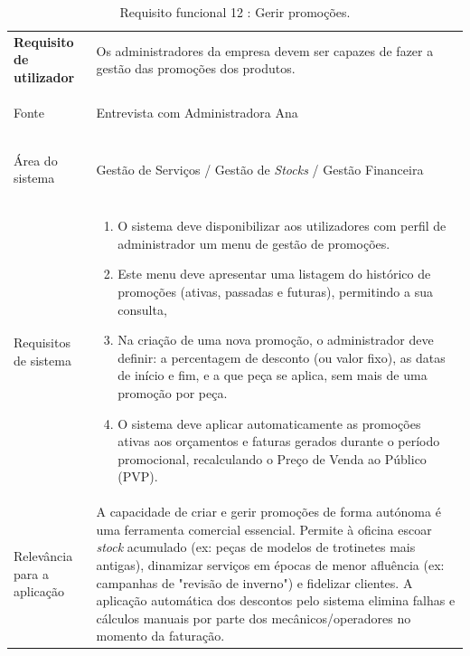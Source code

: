 \documentclass[a4paper,12pt]{scrreprt}
\begin{document}
\begin{table}[H]
    \centering
    \renewcommand{\arraystretch}{1.5} 
    
    \begin{tabular}{|>{\columncolor{gray!15}\bfseries}p{4cm}|p{10.5cm}|}
        \hline
        Requisito de utilizador & Os administradores da empresa devem ser capazes de fazer a gestão das promoções dos produtos.\\ \hdashline
      
        Fonte & Entrevista com Administradora Ana \\ \hdashline
        
        Área do sistema & Gestão de Serviços / Gestão de \textit{Stocks} / Gestão Financeira \\ \hdashline
        
        Requisitos de sistema & 
        \begin{enumerate}[leftmargin=*, nosep, topsep=2pt, partopsep=0pt]
            \item O sistema deve disponibilizar aos utilizadores com perfil de administrador um menu de gestão de promoções.
            \item Este menu deve apresentar uma listagem do histórico de promoções (ativas, passadas e futuras), permitindo a sua consulta,
            \item Na criação de uma nova promoção, o administrador deve definir: a percentagem de desconto (ou valor fixo), as datas de início e fim, e a que peça se aplica, sem mais de uma promoção por peça.
            \item O sistema deve aplicar automaticamente as promoções ativas aos orçamentos e faturas gerados durante o período promocional, recalculando o Preço de Venda ao Público (PVP).
        \end{enumerate} \\ \hdashline
        
        Relevância para a aplicação & A capacidade de criar e gerir promoções de forma autónoma é uma ferramenta comercial essencial. Permite à oficina escoar \textit{stock} acumulado (ex: peças de modelos de trotinetes mais antigas), dinamizar serviços em épocas de menor afluência (ex: campanhas de "revisão de inverno") e fidelizar clientes. A aplicação automática dos descontos pelo sistema elimina falhas e cálculos manuais por parte dos mecânicos/operadores no momento da faturação.\\ \hline
    \end{tabular}
    \caption{Requisito funcional 12 : Gerir promoções.}
    \label{tab:rf_gerir_promocoes}
\end{table}
\end{document}
